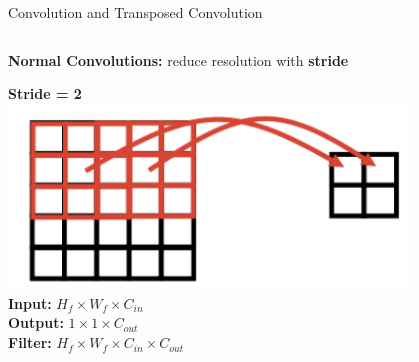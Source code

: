 \documentclass[serif, aspectratio=169]{beamer}
\begin{document}
\begin{frame}{Convolution and Transposed Convolution}
\small
\vspace{-0.3cm}

\begin{columns}[T]

    \begin{column}{0.5\textwidth}
        \textbf{Normal Convolutions:} reduce resolution with \textbf{stride}\\
        \begin{center}
            \textbf{Stride = 2}\\
            \includegraphics[width=0.8\textwidth]{pic/Conv vs Transpose Conv1.png}\\ 
            \vspace{0.75cm}
            \textbf{Input:} \( H_f \times W_f \times C_{in} \) \\
            \textbf{Output:} \( 1 \times 1 \times C_{out} \) \\
            \textbf{Filter:} \( H_f \times W_f \times C_{in} \times C_{out} \)
        \end{center}
    \end{column}


\end{columns}
\end{frame}
\end{document}
